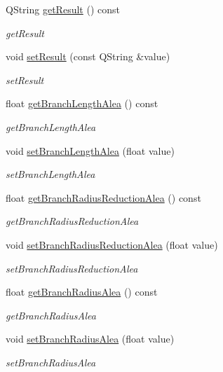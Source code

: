 \begin{DoxyCompactItemize}
Q\+String \hyperlink{classLSystem_a10af0c8572f41e0eb1f2306c09c894d0}{get\+Result} () const
\begin{DoxyCompactList}\small\item\em get\+Result \end{DoxyCompactList}\item 
void \hyperlink{classLSystem_a983ac2b4d6becc3a5f8b5ab082b71de1}{set\+Result} (const Q\+String \&value)
\begin{DoxyCompactList}\small\item\em set\+Result \end{DoxyCompactList}\item 
float \hyperlink{classLSystem_a947039d67e95d2fcac3dea513c64ed39}{get\+Branch\+Length\+Alea} () const
\begin{DoxyCompactList}\small\item\em get\+Branch\+Length\+Alea \end{DoxyCompactList}\item 
void \hyperlink{classLSystem_ad09d0ac8d510a5aae1cc090a7b6c0266}{set\+Branch\+Length\+Alea} (float value)
\begin{DoxyCompactList}\small\item\em set\+Branch\+Length\+Alea \end{DoxyCompactList}\item 
float \hyperlink{classLSystem_af237321da5b4bad46d2422cd29b46986}{get\+Branch\+Radius\+Reduction\+Alea} () const
\begin{DoxyCompactList}\small\item\em get\+Branch\+Radius\+Reduction\+Alea \end{DoxyCompactList}\item 
void \hyperlink{classLSystem_abc2ccf751660dc5ffb4e90db527bed38}{set\+Branch\+Radius\+Reduction\+Alea} (float value)
\begin{DoxyCompactList}\small\item\em set\+Branch\+Radius\+Reduction\+Alea \end{DoxyCompactList}\item 
float \hyperlink{classLSystem_ad76d3b4b6f1b5bdd089b885c4e286543}{get\+Branch\+Radius\+Alea} () const
\begin{DoxyCompactList}\small\item\em get\+Branch\+Radius\+Alea \end{DoxyCompactList}\item 
void \hyperlink{classLSystem_ae33f0faa46188cde512df810889b0f21}{set\+Branch\+Radius\+Alea} (float value)
\begin{DoxyCompactList}\small\item\em set\+Branch\+Radius\+Alea \end{DoxyCompactList}\item 

\end{DoxyCompactItemize}

